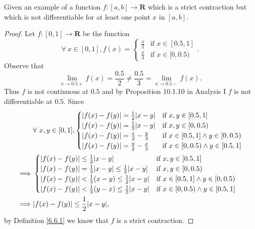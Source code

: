 \begin{exercise}\label{ex 6.6.4}
    Given an example of a function \(f : [a, b] \to \mathbf{R}\) which is a strict contraction but which is not differentiable for at least one point \(x\) in \([a, b]\).
\end{exercise}

\begin{proof}
    Let \(f : [0, 1] \to \mathbf{R}\) be the function
    \[
        \forall\ x \in [0, 1], f(x) = \begin{cases}
            \frac{x}{2} & \text{if } x \in [0.5, 1] \\
            \frac{x}{3} & \text{if } x \in [0, 0.5)
        \end{cases}.
    \]
    Observe that
    \[
        \lim_{x \to 0.5+} f(x) = \frac{0.5}{2} \neq \frac{0.5}{3} = \lim_{x \to 0.5-} f(x).
    \]
    Thus \(f\) is not continuous at \(0.5\) and by Proposition 10.1.10 in Analysis I \(f\) is not differentiable at \(0.5\).
    Since
    \begin{align*}
                 & \forall\ x, y \in [0, 1], \begin{cases}
            \abs*{f(x) - f(y)} = \frac{1}{2} \abs*{x - y}  & \text{if } x, y \in [0.5, 1]                   \\
            \abs*{f(x) - f(y)} = \frac{1}{3} \abs*{x - y}  & \text{if } x, y \in [0, 0.5)                   \\
            \abs*{f(x) - f(y)} = \frac{x}{2} - \frac{y}{3} & \text{if } x \in [0.5, 1] \land y \in [0, 0.5) \\
            \abs*{f(x) - f(y)} = \frac{y}{2} - \frac{x}{3} & \text{if } x \in [0, 0.5) \land y \in [0.5, 1]
        \end{cases} \\
        \implies & \begin{cases}
            \abs*{f(x) - f(y)} \leq \frac{1}{2} \abs*{x - y}                            & \text{if } x, y \in [0.5, 1]                   \\
            \abs*{f(x) - f(y)} = \frac{1}{3} \abs*{x - y} \leq \frac{1}{2} \abs*{x - y} & \text{if } x, y \in [0, 0.5)                   \\
            \abs*{f(x) - f(y)} < \frac{1}{3} (x - y) \leq \frac{1}{2} \abs*{x - y}      & \text{if } x \in [0.5, 1] \land y \in [0, 0.5) \\
            \abs*{f(x) - f(y)} < \frac{1}{3} (y - x) \leq \frac{1}{2} \abs*{x - y}      & \text{if } x \in [0, 0.5) \land y \in [0.5, 1]
        \end{cases}                           \\
        \implies & \abs*{f(x) - f(y)} \leq \frac{1}{2} \abs*{x - y},
    \end{align*}
    by Definition \ref{6.6.1} we know that \(f\) is a strict contraction.
\end{proof}

